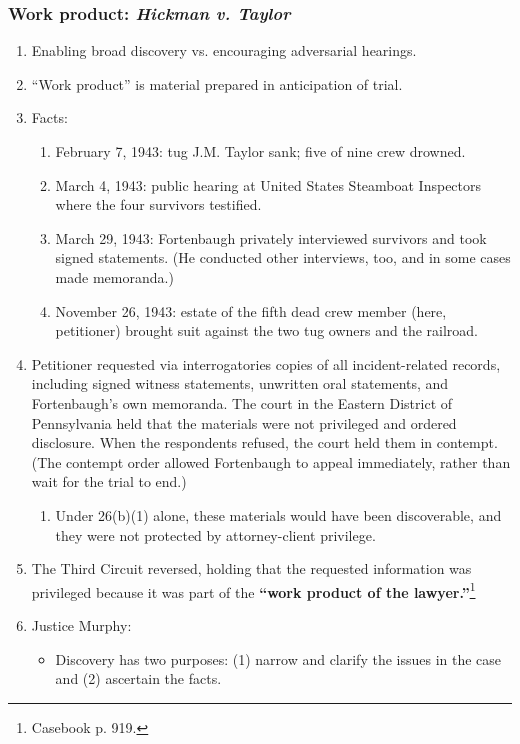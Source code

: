 \subsubsection{Work product: \emph{Hickman v. Taylor}}

\begin{enumerate}
    \item Enabling broad discovery vs. encouraging adversarial hearings.
    \item ``Work product'' is material prepared in anticipation of trial.
    \item Facts:
    \begin{enumerate}
        \item February 7, 1943: tug J.M. Taylor sank; five of nine crew drowned.
        \item March 4, 1943: public hearing at United States Steamboat Inspectors where the four survivors testified.
        \item March 29, 1943: Fortenbaugh privately interviewed survivors and took signed statements. (He conducted other interviews, too, and in some cases made memoranda.)
        \item November 26, 1943: estate of the fifth dead crew member (here, petitioner) brought suit against the two tug owners and the railroad.
    \end{enumerate}
    \item Petitioner requested via interrogatories copies of all incident-related records, including signed witness statements, unwritten oral statements, and Fortenbaugh's own memoranda. The court in the Eastern District of Pennsylvania held that the materials were not privileged and ordered disclosure. When the respondents refused, the court held them in contempt. (The contempt order allowed Fortenbaugh to appeal immediately, rather than wait for the trial to end.)
    \begin{enumerate}
        \item Under 26(b)(1) alone, these materials would have been discoverable, and they were not protected by attorney-client privilege.
    \end{enumerate}
    \item The Third Circuit reversed, holding that the requested information was privileged because it was part of the \textbf{``work product of the lawyer.''}\footnote{Casebook p. 919.}
    \item Justice Murphy:
    \begin{itemize}
        \item Discovery has two purposes: (1) narrow and clarify the issues in the case and (2) ascertain the facts.

\end{itemize}
\end{enumerate}
